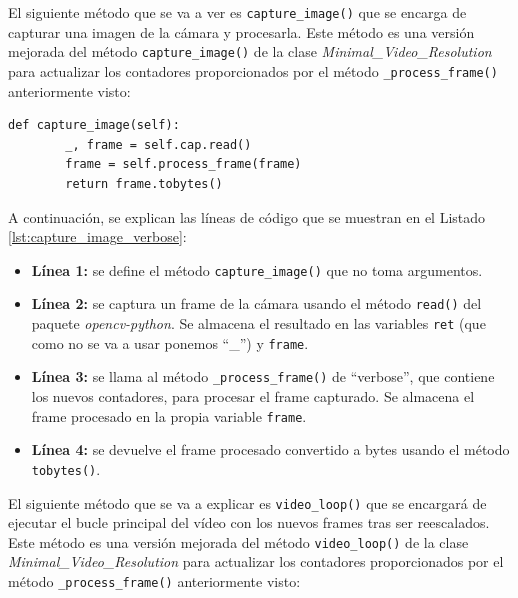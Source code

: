 El siguiente método que se va a ver es \texttt{capture\_image()} que se encarga de capturar una imagen de la cámara y procesarla. Este método es una versión mejorada del método \texttt{capture\_image()} de la clase \textit{Minimal\_Video\_Resolution} para actualizar los contadores proporcionados por el método \texttt{\_process\_frame()} anteriormente visto:
\begin{lstlisting}[style=pythonstyle, caption={Método \texttt{capture\_image()} de \textit{Minimal\_Video\_Resolution\_verbose}.}, label={lst:capture_image_verbose}]
def capture_image(self):
        _, frame = self.cap.read()
        frame = self.process_frame(frame)
        return frame.tobytes()
\end{lstlisting}
\vspace{\baselineskip}

A continuación, se explican las líneas de código que se muestran en el Listado \ref{lst:capture_image_verbose}:
\begin{itemize}
    \item \textbf{Línea 1:} se define el método \texttt{capture\_image()} que no toma argumentos.
    \item \textbf{Línea 2:} se captura un frame de la cámara usando el método \texttt{read()} del paquete \textit{opencv-python}. Se almacena el resultado en las variables \texttt{ret} (que como no se va a usar ponemos ``\_'') y \texttt{frame}.
    \item \textbf{Línea 3:} se llama al método \texttt{\_process\_frame()} de ``verbose'', que contiene los nuevos contadores, para procesar el frame capturado. Se almacena el frame procesado en la propia variable \texttt{frame}.
    \item \textbf{Línea 4:} se devuelve el frame procesado convertido a bytes usando el método \texttt{tobytes()}.
\end{itemize}
\vspace{\baselineskip}

El siguiente método que se va a explicar es \texttt{video\_loop()} que se encargará de ejecutar el bucle principal del vídeo con los nuevos frames tras ser reescalados. Este método es una versión mejorada del método \texttt{video\_loop()} de la clase \textit{Minimal\_Video\_Resolution} para actualizar los contadores proporcionados por el método \texttt{\_process\_frame()} anteriormente visto:

